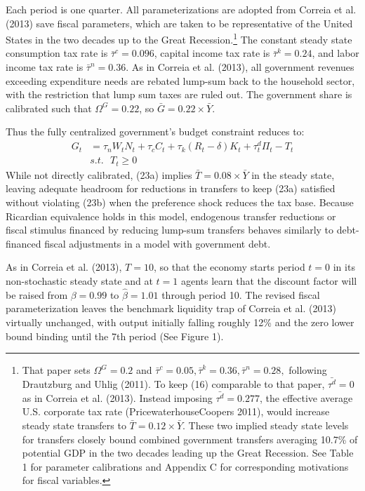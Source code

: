\documentclass[12pt,letterpaper]{article}
\begin{document}
Each period is one quarter. All parameterizations are adopted from Correia et al. (2013) save fiscal parameters, which are taken to be representative of the United States in the two decades up to the Great Recession.\footnote{That paper sets $\Omega^G = 0.2$ and $\bar{\tau}^c = 0.05, \bar{\tau}^k = 0.36, \bar{\tau}^n = 0.28,$ following Drautzburg and Uhlig (2011). To keep (16) comparable to that paper, $\bar{\tau^d} = 0$ as in Correia et al. (2013). Instead imposing $\bar{\tau^d} = 0.277$, the effective average U.S. corporate tax rate (PricewaterhouseCoopers 2011), would increase steady state transfers to $\bar{T} = 0.12 \times \bar{Y}$. These two implied steady state levels for transfers closely bound combined government transfers averaging 10.7\% of potential GDP in the two decades leading up the Great Recession. See Table 1 for parameter calibrations and Appendix C for corresponding motivations for fiscal variables.} The constant steady state consumption tax rate is $\bar{\tau}^c = 0.096$, capital income tax rate is $\bar{\tau}^k = 0.24$, and labor income tax rate is $\bar{\tau}^n = 0.36$. As in Correia et al. (2013), all government revenues exceeding expenditure needs are rebated lump-sum back to the household sector, with the restriction that lump sum taxes are ruled out. The government share is calibrated such that $\Omega^G = 0.22$, so $\bar{G} = 0.22 \times \bar{Y}$. 

Thus the fully centralized government's budget constraint reduces to:
\begin{subequations} 
\begin{align}
G_t &= \tau_n W_t N_t + \tau_c C_t + \tau_k (R_t - \delta) K_t  + \tau^d_t \Pi_t - T_t  \\ 
& s.t. \ \ \ T_t \geq 0
\end{align}
\end{subequations}
While not directly calibrated, (23a) implies $\bar{T} = 0.08 \times \bar{Y}$ in the steady state, leaving adequate headroom for reductions in transfers to keep (23a) satisfied without violating (23b) when the preference shock reduces the tax base. Because Ricardian equivalence holds in this model, endogenous transfer reductions or fiscal stimulus financed by reducing lump-sum transfers behaves similarly to debt-financed fiscal adjustments in a model with government debt.

As in Correia et al. (2013), $T = 10$, so that the economy starts period $t=0$ in its non-stochastic steady state and at $t=1$ agents learn that the discount factor will be raised from $\beta = 0.99$ to $\hat{\beta} = 1.01$ through period 10. The revised fiscal parameterization leaves the benchmark liquidity trap of Correia et al. (2013) virtually unchanged, with output initially falling roughly 12\% and the zero lower bound binding until the 7th period (See Figure 1). 
\end{document}
